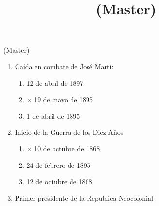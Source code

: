 \documentclass[twocolumn]{article}
\title{  (Master) }
\date{}
\begin{document}

\begin{center}
 \Large{  (Master) }
\end{center}



\begin{enumerate}



  \item Caída en combate de José Martí:

  \begin{enumerate}
   
   \item  12 de abril de 1897
   
   \item $\times$ 19 de mayo de 1895
   
   \item  1 de abril de 1895
   
  \end{enumerate}



  \item Inicio de la Guerra de los Diez Años

  \begin{enumerate}
   
   \item $\times$ 10 de octubre de 1868
   
   \item  24 de febrero de 1895
   
   \item  12 de octubre de 1868
   
  \end{enumerate}



  \item Primer presidente de la Republica Neocolonial


\end{enumerate}
\end{document}
